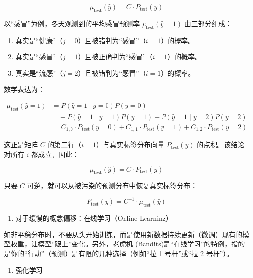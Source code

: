 \[
\mu_{\mathrm{test}}(\hat{y})=C\cdot P_{\mathrm{test}}(y)
\]

以``感冒''为例，冬天观测到的平均感冒预测率 \(\mu_{\mathrm{test}}(\hat{y}=1)\) 由三部分组成：

\begin{enumerate}
\def\labelenumi{\arabic{enumi}.}
\tightlist
\item
  真实是``健康''（\(j=0\)）且被错判为``感冒''（\(i=1\)）的概率。
\item
  真实是``感冒''（\(j=1\)）且被正确判为``感冒''（\(i=1\)）的概率。
\item
  真实是``流感''（\(j=2\)）且被错判为``感冒''（\(i=1\)）的概率。
\end{enumerate}

数学表达为：

\[
\begin{aligned}
\mu_{\mathrm{test}}(\hat{y}=1)
&=P(\hat{y}=1\mid y=0)P(y=0)\\
&\quad+P(\hat{y}=1\mid y=1)P(y=1)
+P(\hat{y}=1\mid y=2)P(y=2)\\
&=C_{1,0}\cdot P_{\mathrm{test}}(y=0)
+C_{1,1}\cdot P_{\mathrm{test}}(y=1)
+C_{1,2}\cdot P_{\mathrm{test}}(y=2)
\end{aligned}
\]

这正是矩阵 \(C\) 的第二行（\(i=1\)）与真实标签分布向量 \(P_{\mathrm{test}}(y)\) 的点积。该结论对所有 \(i\) 都成立，因此：

\[
\mu_{\mathrm{test}}(\hat{y})=C\cdot P_{\mathrm{test}}(y)
\]

只要 \(C\) 可逆，就可以从被污染的预测分布中恢复真实标签分布：

\[
P_{\mathrm{test}}(y)=C^{-1}\cdot\mu_{\mathrm{test}}(\hat{y})
\]

\begin{enumerate}
\def\labelenumi{\arabic{enumi}.}
\setcounter{enumi}{2}
\tightlist
\item
  对于缓慢的概念偏移：在线学习（Online Learning）
\end{enumerate}

如非平稳分布时，不要从头开始训练，而是使用新数据持续更新（微调）现有的模型权重，让模型``跟上''变化。另外，老虎机 (Bandits)是``在线学习''的特例，指的是你的``行动''（预测）是有限的几种选择（例如``拉 1 号杆''或``拉 2 号杆''）。

\begin{enumerate}
\def\labelenumi{\arabic{enumi}.}
\setcounter{enumi}{3}
\tightlist
\item
  强化学习
\end{enumerate}

